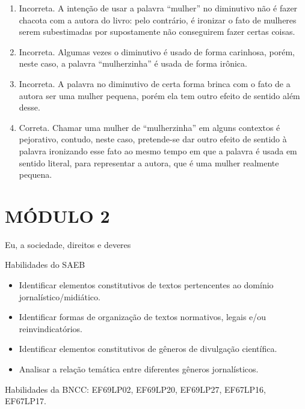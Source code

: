 \begin{enumerate}
	\def\labelenumi{\alph{enumi})}
\item Incorreta. A intenção de usar a palavra ``mulher'' no diminutivo não
é fazer chacota com a autora do livro: pelo contrário, é ironizar o fato
de mulheres serem subestimadas por supostamente não conseguirem fazer
certas coisas.
\item Incorreta. Algumas vezes o diminutivo é usado de forma carinhosa,
porém, neste caso, a palavra ``mulherzinha'' é usada de forma irônica.
\item Incorreta. A palavra no diminutivo de certa forma brinca com o fato
de a autora ser uma mulher pequena, porém ela tem outro efeito de
sentido além desse.
\item Correta. Chamar uma mulher de ``mulherzinha'' em alguns contextos é
pejorativo, contudo, neste caso, pretende-se dar outro efeito de sentido
à palavra ironizando esse fato ao mesmo tempo em que a palavra é usada
em sentido literal, para representar a autora, que é uma mulher
realmente pequena.
\end{enumerate}

\section{MÓDULO 2}

Eu, a sociedade, direitos e deveres

Habilidades do SAEB

\begin{itemize}
\tightlist
\item Identificar elementos constitutivos de textos pertencentes ao domínio jornalístico/midiático.
\item Identificar formas de organização de textos normativos, legais e/ou reinvindicatórios.
\item Identificar elementos constitutivos de gêneros de divulgação científica.
\item Analisar a relação temática entre diferentes gêneros jornalísticos.
\end{itemize}

Habilidades da BNCC: EF69LP02, EF69LP20, EF69LP27, EF67LP16, EF67LP17.

